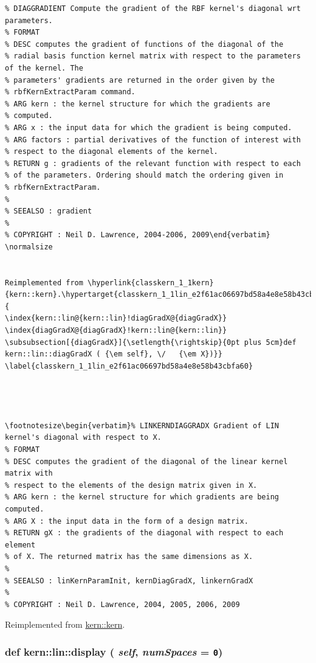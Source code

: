 \footnotesize\begin{verbatim}% DIAGGRADIENT Compute the gradient of the RBF kernel's diagonal wrt parameters.
% FORMAT
% DESC computes the gradient of functions of the diagonal of the
% radial basis function kernel matrix with respect to the parameters of the kernel. The
% parameters' gradients are returned in the order given by the
% rbfKernExtractParam command.
% ARG kern : the kernel structure for which the gradients are
% computed.
% ARG x : the input data for which the gradient is being computed.
% ARG factors : partial derivatives of the function of interest with
% respect to the diagonal elements of the kernel.
% RETURN g : gradients of the relevant function with respect to each
% of the parameters. Ordering should match the ordering given in
% rbfKernExtractParam.
%
% SEEALSO : gradient
%
% COPYRIGHT : Neil D. Lawrence, 2004-2006, 2009\end{verbatim}
\normalsize
 

Reimplemented from \hyperlink{classkern_1_1kern}{kern::kern}.\hypertarget{classkern_1_1lin_e2f61ac06697bd58a4e8e58b43cbfa60}{
\index{kern::lin@{kern::lin}!diagGradX@{diagGradX}}
\index{diagGradX@{diagGradX}!kern::lin@{kern::lin}}
\subsubsection[{diagGradX}]{\setlength{\rightskip}{0pt plus 5cm}def kern::lin::diagGradX ( {\em self}, \/   {\em X})}}
\label{classkern_1_1lin_e2f61ac06697bd58a4e8e58b43cbfa60}




\footnotesize\begin{verbatim}% LINKERNDIAGGRADX Gradient of LIN kernel's diagonal with respect to X.
% FORMAT
% DESC computes the gradient of the diagonal of the linear kernel matrix with
% respect to the elements of the design matrix given in X.
% ARG kern : the kernel structure for which gradients are being computed.
% ARG X : the input data in the form of a design matrix.
% RETURN gX : the gradients of the diagonal with respect to each element
% of X. The returned matrix has the same dimensions as X.
%
% SEEALSO : linKernParamInit, kernDiagGradX, linkernGradX
%
% COPYRIGHT : Neil D. Lawrence, 2004, 2005, 2006, 2009

\end{verbatim}
\normalsize
 

Reimplemented from \hyperlink{classkern_1_1kern}{kern::kern}.\hypertarget{classkern_1_1lin_5f51f5aa6fb00f2435cf8a1d98b15ba1}{
\subsubsection[{display}]{\setlength{\rightskip}{0pt plus 5cm}def kern::lin::display ( {\em self}, \/   {\em numSpaces} = {\tt 0})}}
\label{classkern_1_1lin_5f51f5aa6fb00f2435cf8a1d98b15ba1}




